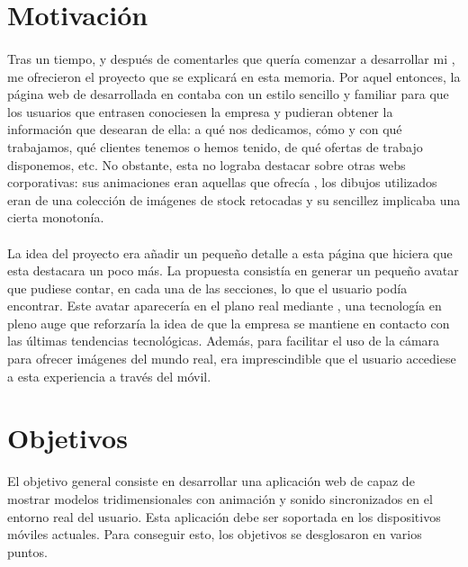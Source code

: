 \documentclass{subfiles}
\begin{document}
        \section{Motivación}
        \label{sec:motivacion}
        
        \paragraph{}
        {Tras un tiempo, y después de comentarles que quería comenzar a desarrollar mi \TFG, me ofrecieron el proyecto que se explicará en esta memoria. Por aquel entonces, la página web de \silverstorm desarrollada en \wordpress contaba con un estilo sencillo y familiar para que los usuarios que entrasen conociesen la empresa y pudieran obtener la información que desearan de ella: a qué nos dedicamos, cómo y con qué trabajamos, qué clientes tenemos o hemos tenido, de qué ofertas de trabajo disponemos, etc. No obstante, esta no lograba destacar sobre otras webs corporativas: sus animaciones eran aquellas que ofrecía \wordpress, los dibujos utilizados eran de una colección de imágenes de stock retocadas y su sencillez implicaba una cierta monotonía.}
        
        \paragraph{}
        {La idea del proyecto era añadir un pequeño detalle a esta página que hiciera que esta destacara un poco más. La propuesta consistía en generar un pequeño avatar que pudiese contar, en cada una de las secciones, lo que el usuario podía encontrar. Este avatar aparecería en el plano real mediante \ra, una tecnología en pleno auge \cite{Xiong2021} que reforzaría la idea de que la empresa se mantiene en contacto con las últimas tendencias tecnológicas. Además, para facilitar el uso de la cámara para ofrecer imágenes del mundo real, era imprescindible que el usuario accediese a esta experiencia a través del móvil.}

        \section{Objetivos}
        \label{sec:objetivos}
        {El objetivo general consiste en desarrollar una aplicación web de \ra capaz de mostrar modelos tridimensionales con animación y sonido sincronizados en el entorno real del usuario. Esta aplicación debe ser soportada en los dispositivos móviles actuales. Para conseguir esto, los objetivos se desglosaron en varios puntos.}
\end{document}
